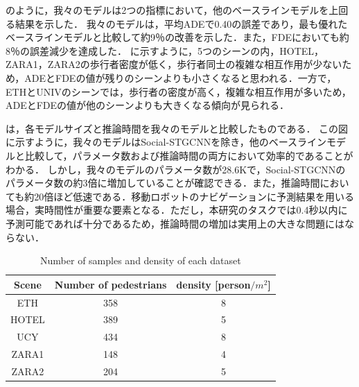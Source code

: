 \protect{}

のように，我々のモデルは2つの指標において，他のベースラインモデルを上回る結果を示した．
我々のモデルは，平均ADEで0.40の誤差であり，最も優れたベースラインモデルと比較して約9％の改善を示した．また，FDEにおいても約8％の誤差減少を達成した．
に示すように，5つのシーンの内，HOTEL，ZARA1，ZARA2の歩行者密度が低く，歩行者同士の複雑な相互作用が少ないため，ADEとFDEの値が残りのシーンよりも小さくなると思われる．一方で，
ETHとUNIVのシーンでは，歩行者の密度が高く，複雑な相互作用が多いため，ADEとFDEの値が他のシーンよりも大きくなる傾向が見られる．

\newpage

は，各モデルサイズと推論時間を我々のモデルと比較したものである．
この図に示すように，我々のモデルはSocial-STGCNN\cite{s-stgcnn}を除き，他のベースラインモデルと比較して，パラメータ数および推論時間の両方において効率的であることがわかる．
しかし，我々のモデルのパラメータ数が28.6Kで，Social-STGCNNのパラメータ数の約3倍に増加していることが確認できる．また，推論時間においても約20倍ほど低速である．移動ロボットのナビゲーションに予測結果を用いる場合，実時間性が重要な要素となる．ただし，本研究のタスクでは0.4秒以内に予測可能であれば十分であるため，推論時間の増加は実用上の大きな問題にはならない．

\begin{table}[hbtp]
  \begin{center}
  \caption{Number of samples and density of each dataset\protect\footnotemark[7]}
  \label{tab:density}
  \begin{tabular}{c||c|c}
  Scene & Number of pedestrians & density [person$/ m^2$] \\ 
  \hline \hline
  ETH      & 358       & 8                      \\
  \hline
  HOTEL    & 389       & 5                      \\
  \hline
  UCY      & 434       & 8                      \\
  \hline
  ZARA1   & 148       & 4                      \\
  \hline
  ZARA2   & 204       & 5                      \\
  \hline
  \end{tabular}
  \end{center}
\end{table}

\protect{}

